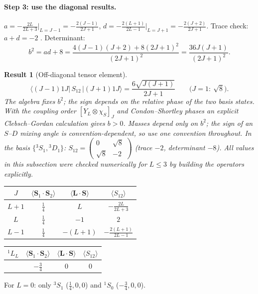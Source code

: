 \documentclass[11pt,a4paper]{article}
\numberwithin{equation}{section}
\theoremstyle{definition}
\theoremstyle{plain}
\newtheorem{result}[definition]{Result}
\theoremstyle{remark}
\newenvironment{keyresult}[1][Key result]{\begin{tcolorbox}[keybox,title={\small\bfseries #1},fonttitle=\small,coltitle=white,colbacktitle=MidnightBlue!70]}{\end{tcolorbox}}
\numberwithin{algorithm}{section}
\newcommand{\vL}{\bm L}
\newcommand{\vS}{\bm S}
\begin{document}
\paragraph{Step 3: use the diagonal results.} $a=-\frac{2L}{2L+3}\big|_{L=J-1}=-\frac{2(J-1)}{2J+1}$, $d=-\frac{2(L+1)}{2L-1}\big|_{L=J+1}=-\frac{2(J+2)}{2J+1}$. Trace check: $a+d=-2$ \checkmark. Determinant:
\begin{equation*}
b^2=ad+8=\frac{4(J-1)(J+2)+8(2J+1)^2}{(2J+1)^2}=\frac{36J(J+1)}{(2J+1)^2}.
\end{equation*}
\begin{result}[Off-diagonal tensor element]
\begin{equation}
\langle (J{-}1)1J|\,S_{12}\,|(J{+}1)1J\rangle=\frac{6\sqrt{J(J+1)}}{2J+1}\qquad\Big(J=1:\ \sqrt8\Big).
\end{equation}
The algebra fixes $b^2$; the sign depends on the relative phase of the two basis states. With the coupling order $[Y_L\otimes\chi_S]_J$ and Condon--Shortley phases an explicit Clebsch--Gordan calculation gives $b>0$. Masses depend only on $b^2$; the sign of an $S$--$D$ mixing angle is convention-dependent, so use one convention throughout. In the basis $\{{}^3S_1,{}^3D_1\}$: $S_{12}=\begin{pmatrix}0&\sqrt8\\\sqrt8&-2\end{pmatrix}$ (trace $-2$, determinant $-8$).
All values in this subsection were checked numerically for $L\le3$ by building the operators explicitly.
\end{result}

\begin{keyresult}[Spin--angle factors for $S=1$, ${}^3L_J$]
\begin{center}
\begin{tabular}{@{}cccc@{}}
\toprule
$J$ & $\langle\vS_1\!\cdot\!\vS_2\rangle$ & $\langle\vL\!\cdot\!\vS\rangle$ & $\langle S_{12}\rangle$\\\midrule
$L+1$ & $\frac14$ & $L$ & $-\frac{2L}{2L+3}$\\
$L$ & $\frac14$ & $-1$ & $2$\\
$L-1$ & $\frac14$ & $-(L+1)$ & $-\frac{2(L+1)}{2L-1}$\\\bottomrule
\end{tabular}
\qquad
\begin{tabular}{@{}cccc@{}}
\toprule
${}^1L_L$ & $\langle\vS_1\!\cdot\!\vS_2\rangle$ & $\langle\vL\!\cdot\!\vS\rangle$ & $\langle S_{12}\rangle$\\\midrule
 & $-\frac34$ & $0$ & $0$\\\bottomrule
\end{tabular}
\end{center}
For $L=0$: only ${}^3S_1$ ($\frac14,0,0$) and ${}^1S_0$ ($-\frac34,0,0$).
\end{keyresult}
\end{document}
